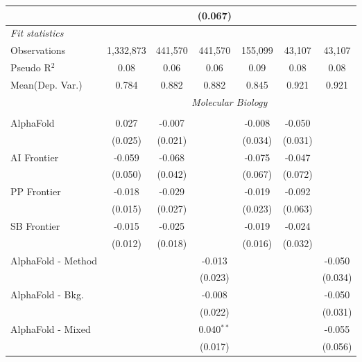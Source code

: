 \begin{tabular}{lcccccc}
                        &              &         & (0.067)       &               &               &   \\   
   \midrule
   \emph{Fit statistics}\\
   Observations         & 1,332,873    & 441,570 & 441,570       & 155,099       & 43,107        & 43,107\\  
   Pseudo R$^2$         & 0.08         & 0.06    & 0.06          & 0.09          & 0.08          & 0.08\\  
Mean(Dep. Var.) & 0.784 & 0.882 & 0.882 & 0.845 & 0.921 & 0.921 \\
   
 & \multicolumn{6}{c}{\textit{Molecular Biology}} \\ \\
   AlphaFold            & 0.027   & -0.007  &              & -0.008  & -0.050  &   \\   
                        & (0.025) & (0.021) &              & (0.034) & (0.031) &   \\   
   AI Frontier          & -0.059  & -0.068  &              & -0.075  & -0.047  &   \\   
                        & (0.050) & (0.042) &              & (0.067) & (0.072) &   \\   
   PP Frontier          & -0.018  & -0.029  &              & -0.019  & -0.092  &   \\   
                        & (0.015) & (0.027) &              & (0.023) & (0.063) &   \\   
   SB Frontier          & -0.015  & -0.025  &              & -0.019  & -0.024  &   \\   
                        & (0.012) & (0.018) &              & (0.016) & (0.032) &   \\   
   AlphaFold - Method   &         &         & -0.013       &         &         & -0.050\\   
                        &         &         & (0.023)      &         &         & (0.034)\\   
   AlphaFold - Bkg.     &         &         & -0.008       &         &         & -0.050\\   
                        &         &         & (0.022)      &         &         & (0.031)\\   
   AlphaFold - Mixed    &         &         & 0.040$^{**}$ &         &         & -0.055\\   
                        &         &         & (0.017)      &         &         & (0.056)\\   

\end{tabular}
